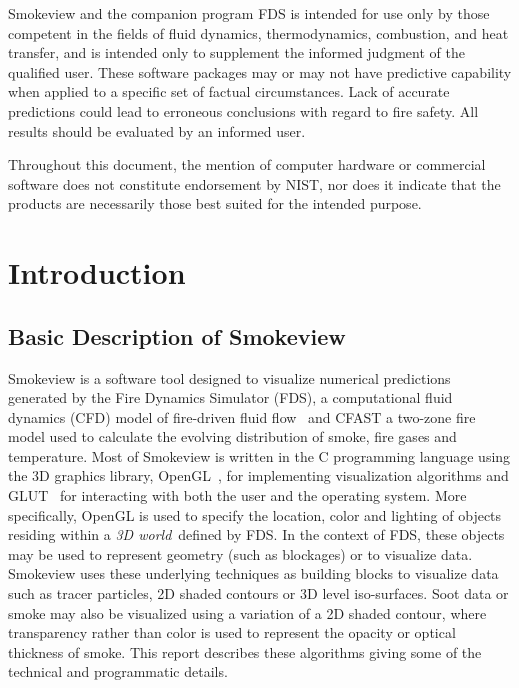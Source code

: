\documentclass[11pt,twoside]{book}
\begin{document}
Smokeview and the companion program FDS is intended for use only
by those competent in the fields of fluid dynamics,
thermodynamics, combustion, and heat transfer, and is intended
only to supplement the informed judgment of the qualified user.
These software packages may or may not have predictive capability
when applied to a specific set of factual circumstances. Lack of
accurate predictions could lead to erroneous conclusions with
regard to fire safety. All results should be evaluated by an
informed user.

Throughout this document, the mention of computer hardware or
commercial software does not constitute endorsement by NIST, nor
does it indicate that the products are necessarily those best
suited for the intended purpose.

%
%



\cleardoublepage
\tableofcontents

\cleardoublepage
\listoffigures

\mainmatter


%
%

\chapter{Introduction}
\section{Basic Description of Smokeview}
Smokeview is a software tool designed to visualize numerical
predictions generated by the Fire Dynamics Simulator (FDS), a
computational fluid dynamics (CFD) model of fire-driven fluid
flow~\cite{FDS_Tech_Guide,FDS_Users_Guide} and CFAST a two-zone
fire model\cite{Peacock:1} used to calculate the evolving
distribution of smoke, fire gases and temperature. Most of
Smokeview is written in the C programming language using the 3D
graphics library, OpenGL~\cite{OpenGLRed}, for implementing
visualization algorithms and GLUT~\cite{OpenGLGlut} for
interacting with both the user and the operating system. More
specifically, OpenGL is used to specify the location, color and
lighting of objects residing within a {\em 3D world}\ defined by
FDS. In the context of FDS, these objects may be used to represent
geometry (such as blockages) or to visualize data. Smokeview uses
these underlying techniques as building blocks to visualize data
such as tracer particles, 2D shaded contours or 3D level
iso-surfaces.  Soot data or smoke may also be visualized using a
variation of a 2D shaded contour, where transparency rather than
color is used to represent the opacity or optical thickness of
smoke. This report describes these algorithms giving some of the
technical and programmatic details.
\end{document}
